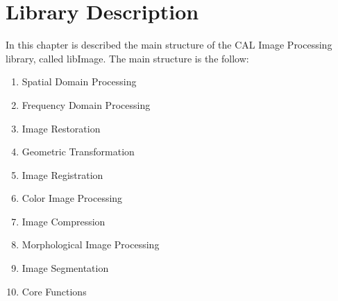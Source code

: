 \chapter{Library Description}
In this chapter is described the main structure of the CAL Image Processing library, called libImage.
The main structure is the follow:

\begin{enumerate}
	\item Spatial Domain Processing
	\item Frequency Domain Processing
	\item Image Restoration
	\item Geometric Transformation
	\item Image Registration
	\item Color Image Processing
	\item Image Compression
	\item Morphological Image Processing
	\item Image Segmentation
	\item Core Functions
\end{enumerate}





















